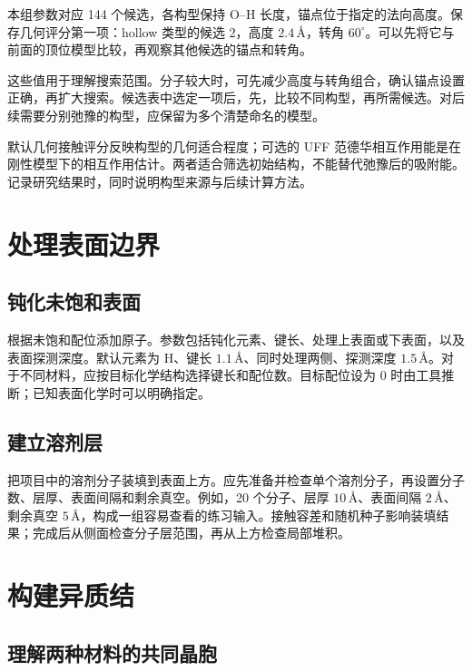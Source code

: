本组参数对应 144 个候选，各构型保持 O--H 长度，锚点位于指定的法向高度。保存几何评分第一项：hollow 类型的候选 2，高度 $2.4\,\text{\AA}$，转角 $60^\circ$。可以先将它与前面的顶位模型比较，再观察其他候选的锚点和转角。

这些值用于理解搜索范围。分子较大时，可先减少高度与转角组合，确认锚点设置正确，再扩大搜索。候选表中选定一项后，先，比较不同构型，再所需候选。对后续需要分别弛豫的构型，应保留为多个清楚命名的模型。

默认几何接触评分反映构型的几何适合程度；可选的 UFF 范德华相互作用能是在刚性模型下的相互作用估计。两者适合筛选初始结构，不能替代弛豫后的吸附能。记录研究结果时，同时说明构型来源与后续计算方法。

\section{处理表面边界}

\subsection{钝化未饱和表面}

根据未饱和配位添加原子。参数包括钝化元素、键长、处理上表面或下表面，以及表面探测深度。默认元素为 H、键长 $1.1\,\text{\AA}$、同时处理两侧、探测深度 $1.5\,\text{\AA}$。对于不同材料，应按目标化学结构选择键长和配位数。目标配位设为 0 时由工具推断；已知表面化学时可以明确指定。

\subsection{建立溶剂层}

把项目中的溶剂分子装填到表面上方。应先准备并检查单个溶剂分子，再设置分子数、层厚、表面间隔和剩余真空。例如，20 个分子、层厚 $10\,\text{\AA}$、表面间隔 $2\,\text{\AA}$、剩余真空 $5\,\text{\AA}$，构成一组容易查看的练习输入。接触容差和随机种子影响装填结果；完成后从侧面检查分子层范围，再从上方检查局部堆积。

\section{构建异质结}\label{sec:heterojunction}

\subsection{理解两种材料的共同晶胞}

